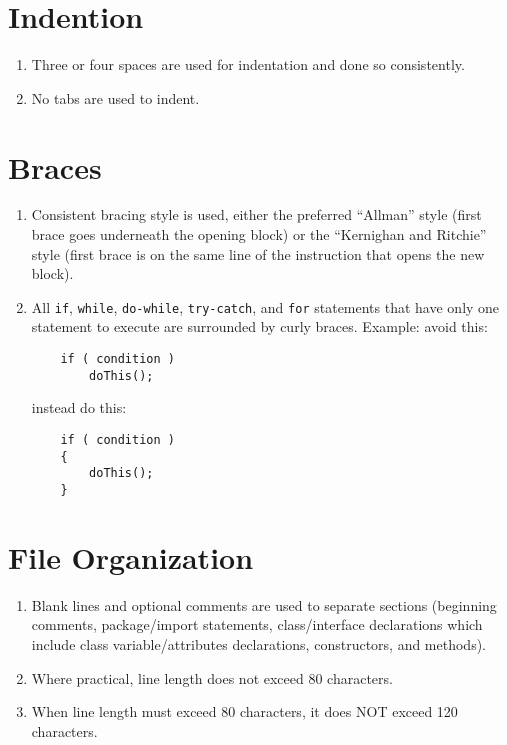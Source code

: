 \section{Indention}\begin{enumerate}[resume]
\item \label{item:8}Three or four spaces are used for indentation and done so consistently.
\item \label{item:9}No tabs are used to indent.
\end{enumerate}

\section{Braces}\begin{enumerate}[resume]
\item \label{item:10}Consistent bracing style is used, either the preferred ``Allman'' style (first brace goes underneath the opening block) or the ``Kernighan and Ritchie'' style (first brace is on the same line of the instruction that opens the new block).
\item \label{item:11}All \texttt{if}, \texttt{while}, \texttt{do-while}, \texttt{try-catch}, and \texttt{for} statements that have only one statement to execute are surrounded by curly braces. Example:
avoid this:

\begin{verbatim}
	if ( condition )
		doThis();
\end{verbatim}

instead do this:

\begin{verbatim}
	if ( condition ) 
	{
		doThis(); 
	}
\end{verbatim}

\end{enumerate}

\section{File Organization}\begin{enumerate}[resume]
\item \label{item:X}Blank lines and optional comments are used to separate sections (beginning comments, package/import statements, class/interface declarations which include class variable/attributes declarations, constructors, and methods).
\item \label{item:X}Where practical, line length does not exceed 80 characters.
\item \label{item:X}When line length must exceed 80 characters, it does NOT exceed 120 characters.
\end{enumerate}

